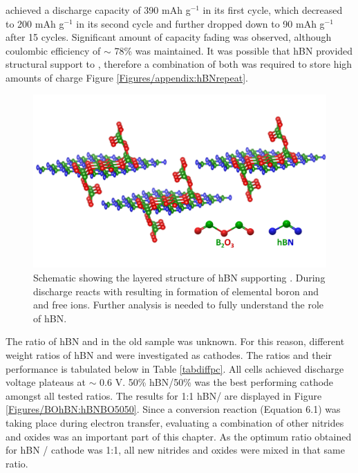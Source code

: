  achieved a discharge capacity of 390 mAh g$^{-1}$ in its first cycle, which decreased to 200 mAh g$^{-1}$ in its second cycle and further dropped down to 90 mAh g$^{-1}$ after 15 cycles. Significant amount of capacity fading was observed, although coulombic efficiency of $\sim$ 78\% was maintained. It was possible that hBN provided structural support to , therefore a combination of both was required to store high amounts of charge Figure \ref{Figures/appendix:hBNrepeat}. 

\begin{figure}[tbh!]
\centering
\includegraphics[width=\textwidth]{Figures/BOhBN/BonhBN}
\caption{Schematic showing the layered structure of hBN supporting . During discharge  reacts with  resulting in formation of elemental boron and  and free  ions. Further analysis is needed to fully understand the role of hBN.}
\label{Figures/BOhBN:BohBN}
\end{figure}

The ratio of hBN  and  in the old sample was unknown. For this reason, different weight ratios of hBN and  were investigated as cathodes. The ratios and their performance is tabulated below in Table \ref{tabdiffpc}. All cells achieved discharge voltage plateaus at $\sim$ 0.6 V. 50\% hBN/50\% was the best performing cathode amongst all tested ratios. The results for 1:1 hBN/ are displayed in Figure \ref{Figures/BOhBN:hBNBO5050}. Since a conversion reaction (Equation 6.1) was taking place during electron transfer, evaluating a combination of other nitrides and oxides was an important part of this chapter. As the optimum ratio obtained for hBN / cathode was 1:1, all new nitrides and oxides were mixed in that same ratio. 

